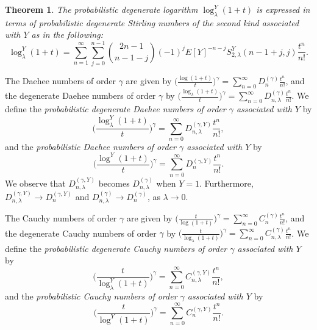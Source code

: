 \documentclass[a4paper,11pt]{amsart}
\newtheorem{theorem}{Theorem}[section]
\begin{document}
\begin{theorem}
The probabilistic degenerate logarithm $\log_{\lambda}^{Y}(1+t)$ is expressed in terms of probabilistic degenerate Stirling numbers of the second kind associated with $Y$ as in the following:
\begin{equation*}
\log_{\lambda}^{Y}(1+t)=\sum_{n=1}^{\infty}\sum_{j=0}^{n-1}\binom{2n-1}{n-1-j}(-1)^{j}E[Y]^{-n-j}S_{2,\lambda}^{Y}(n-1+j,j)\frac{t^{n}}{n!}.
\end{equation*}
\end{theorem}

The Daehee numbers of order $\gamma$ are given by $\big(\frac{\log(1+t)}{t}\big)^{\gamma}=\sum_{n=0}^{\infty}D_{n}^{(\gamma)}\frac{t^{n}}{n!}$, and the degenerate Daehee numbers of order $\gamma$ by $\big(\frac{\log_{\lambda}(1+t)}{t}\big)^{\gamma}=\sum_{n=0}^{\infty}D_{n,\lambda}^{(\gamma)}\frac{t^{n}}{n!}$. We define the {\it{probabilistic degenerate Daehee numbers of order $\gamma$ associated with $Y$}} by
\begin{equation} \label{43}
\Big(\frac{\log_{\lambda}^{Y}(1+t)}{t}\Big)^{\gamma}=\sum_{n=0}^{\infty}D_{n,\lambda}^{(\gamma,Y)}\frac{t^{n}}{n!},
\end{equation}
and the {\it{probabilistic Daehee numbers of order $\gamma$ associated with $Y$}} by
\begin{equation} \label{44}
\Big(\frac{\log^{Y}(1+t)}{t}\Big)^{\gamma}=\sum_{n=0}^{\infty}D_{n}^{(\gamma,Y)}\frac{t^{n}}{n!}.
\end{equation}
We observe that $D_{n,\lambda}^{(\gamma,Y)}$ becomes $D_{n,\lambda}^{(\gamma)}$ when $Y=1$. Furthermore, $D_{n,\lambda}^{(\gamma,Y)} \rightarrow D_{n}^{(\gamma, Y)}$ and $D_{n,\lambda}^{(\gamma)} \rightarrow D_{n}^{(\gamma)}$, as $\lambda \rightarrow 0$. \par
The Cauchy numbers of order $\gamma$ are given by $\big(\frac{t}{\log(1+t)}\big)^{\gamma}=\sum_{n=0}^{\infty}C_{n}^{(\gamma)}\frac{t^{n}}{n!}$, and the degenerate Cauchy numbers of order $\gamma$ by $\big(\frac{t}{\log_{\lambda}(1+t)}\big)^{\gamma}=\sum_{n=0}^{\infty}C_{n,\lambda}^{(\gamma)}\frac{t^{n}}{n!}$. We define the {\it{probabilistic degenerate Cauchy numbers of order $\gamma$ associated with $Y$}} by
\begin{equation} \label{45}
\Big(\frac{t}{\log_{\lambda}^{Y}(1+t)}\Big)^{\gamma}=\sum_{n=0}^{\infty}C_{n,\lambda}^{(\gamma,Y)}\frac{t^{n}}{n!},
\end{equation}
and the {\it{probabilistic Cauchy numbers of order $\gamma$ associated with $Y$}} by
\begin{equation} \label{46}
\Big(\frac{t}{\log^{Y}(1+t)}\Big)^{\gamma}=\sum_{n=0}^{\infty}C_{n}^{(\gamma,Y)}\frac{t^{n}}{n!}.
\end{equation}
\end{document}
